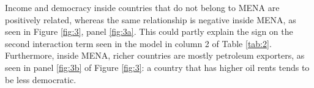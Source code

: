 \documentclass[../main.tex]{subfiles}
\begin{document}
Income and democracy inside countries that do not belong to MENA are positively related, whereas the same relationship is negative inside MENA, as seen in Figure \ref{fig:3}, panel \ref{fig:3a}.  This could partly explain the sign on the second interaction term seen in the model in column 2 of Table \ref{tab:2}. Furthermore, inside MENA, richer countries are mostly petroleum exporters, as seen in panel \ref{fig:3b} of Figure \ref{fig:3}: a country that has higher oil rents tends to be less democratic.
\begin{figure}[H]
\centering
{}
\end{figure}
\end{document}
